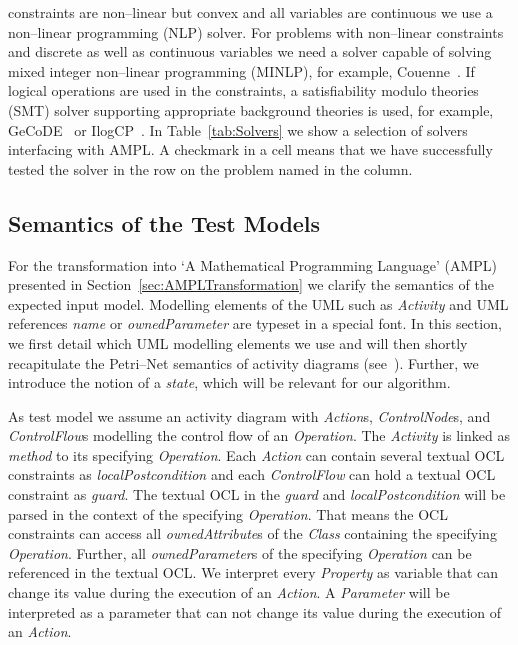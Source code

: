 \documentclass[runningheads,a4paper]{llncs}%
\newcommand{\UMLType}[1]{\textsf{\textit{#1}}} %
\newcommand{\UMLReference}[1]{\textsf{\textit{#1}}} %
\begin{document}
constraints are non--linear but convex and all variables are continuous we use a
non--linear programming (NLP) solver. For problems with non--linear constraints
and discrete as well as continuous variables we need a solver capable of solving
mixed integer non--linear programming (MINLP), for example,
Couenne~\cite{Belotti09couenne}. If logical operations are used in the
constraints, a satisfiability modulo theories (SMT) solver supporting
appropriate background theories is used, for example, GeCoDE~\cite{gecode} or
IlogCP~\cite{ilogcp}. In Table~\ref{tab:Solvers} we show a selection of solvers
interfacing with AMPL. A checkmark in a cell means that we have successfully
tested the solver in the row on the problem named in the column.%

\subsection{Semantics of the Test Models}%
\label{sec:TestModel}%
For the transformation into `A Mathematical Programming Language' (AMPL)
presented in Section~\ref{sec:AMPLTransformation} we clarify the semantics of
the expected input model. Modelling elements of the UML such as
\UMLType{Activity} and UML references \UMLReference{name} or
\UMLReference{ownedParameter} are typeset in a special font. In this section, we
first detail which UML modelling elements we use and will then shortly
recapitulate the Petri--Net semantics of activity diagrams
(see~\cite{UML23Superstructure}). Further, we introduce the notion of a
\emph{state}, which will be relevant for our algorithm.

As test model we assume an activity diagram with \UMLType{Action}s,
\UMLType{ControlNode}s, and \UMLType{ControlFlow}s modelling the control flow of
an \UMLType{Operation}. The \UMLType{Activity} is linked as
\UMLReference{method} to its specifying \UMLType{Operation}. Each
\UMLType{Action} can contain several textual OCL constraints as
\UMLReference{localPostcondition} and each \UMLType{ControlFlow} can hold a
textual OCL constraint as \UMLReference{guard}. The textual OCL in the
\UMLReference{guard} and \UMLReference{localPostcondition} will be parsed in the
context of the specifying \UMLType{Operation}. That means the OCL constraints
can access all \UMLReference{ownedAttribute}s of the \UMLType{Class} containing
the specifying \UMLType{Operation}. Further, all \UMLReference{ownedParameter}s
of the specifying \UMLType{Operation} can be referenced in the textual OCL. We
interpret every \UMLType{Property} as variable that can change its value during
the execution of an \UMLType{Action}. A \UMLType{Parameter} will be interpreted
as a parameter that can not change its value during the execution of an
\UMLType{Action}.
\end{document}
